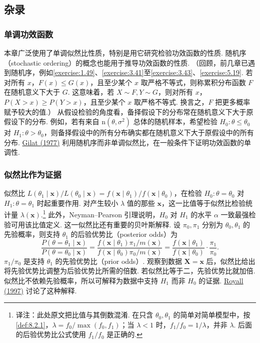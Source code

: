 \subsection{杂录}\label{sec:8.5}
\subsubsection{单调功效函数}\label{sec:8.5.1}
本章广泛使用了单调似然比性质，特别是用它研究检验功效函数的性质. 随机序（stochastic ordering）的概念也能用于推导功效函数的性质. （回顾，前几章已遇到随机序，例如\autoref{exercise:1.49}、\autoref{exercise:3.41}至\autoref{exercise:3.43}、\autoref{exercise:5.19}. 若对所有 $x$，$F(x)\le G(x)$，且至少某个 $x$ 取严格不等式，则称累积分布函数 $F$ 在随机意义下大于 $G$. 这意味着，若 $X\sim F,Y\sim G$，则对所有 $x$，$P(X>x)\ge P(Y>x)$，且至少某个 $x$ 取严格不等式. 换言之，$F$ 把更多概率赋予较大的值.）
从假设检验的角度看，备择假设下的分布常在随机意义下大于原假设下的分布. 例如，若有来自 $\mathrm n(\theta,\sigma^2)$ 总体的随机样本，希望检验 $H_0:\theta\le\theta_0$ 对 $H_1:\theta>\theta_0$，则备择假设中的所有分布确实都在随机意义下大于原假设中的所有分布. \hyperref[bib:source142]{Gilat (1977)} 利用随机序而非单调似然比，在一般条件下证明功效函数的单调性.

\subsubsection{似然比作为证据}\label{sec:8.5.2}
似然比 $L(\theta_1\mid\boldsymbol x)/L(\theta_0\mid\boldsymbol x)=f(\boldsymbol x\mid\theta_1)/f(\boldsymbol x\mid\theta_0)$，在检验 $H_0:\theta=\theta_0$ 对 $H_1:\theta=\theta_1$ 时起重要作用. 对产生较小 $\lambda$ 值的那些 $\boldsymbol x$，这一比值等于似然比检验统计量 $\lambda(\boldsymbol x)$.\footnote{译注：此处原文把比值与其倒数混淆. 在只含 $\theta_0,\theta_1$ 的简单对简单模型中，按\autoref{def:8.2.1}，$\lambda=f_0/\max(f_0,f_1)$；当 $\lambda<1$ 时，$f_1/f_0=1/\lambda$，并非 $\lambda$. 后面的后验优势比公式使用 $f_1/f_0$ 是正确的.} 此外，Neyman–Pearson 引理说明，$H_0$ 对 $H_1$ 的水平 $\alpha$ 一致最强检验可用该比值定义. 这一似然比还有重要的贝叶斯解释. 设 $\pi_0,\pi_1$ 分别为 $\theta_0,\theta_1$ 的先验概率，则支持 $\theta_1$ 的后验优势比（posterior odds）为
$$\frac{P(\theta=\theta_1\mid\boldsymbol x)}{P(\theta=\theta_0\mid\boldsymbol x)}
=\frac{f(\boldsymbol x\mid\theta_1)\pi_1/m(\boldsymbol x)}{f(\boldsymbol x\mid\theta_0)\pi_0/m(\boldsymbol x)}
=\frac{f(\boldsymbol x\mid\theta_1)}{f(\boldsymbol x\mid\theta_0)}\cdot\frac{\pi_1}{\pi_0}.$$
$\pi_1/\pi_0$ 是支持 $\theta_1$ 的先验优势比（prior odds\mbox{）.} 观察到数据 $\boldsymbol X=\boldsymbol x$ 后，似然比给出将先验优势比调整为后验优势比所需的倍数. 若似然比等于二，先验优势比就加倍. 似然比不依赖先验概率，所以可解释为数据中支持 $H_1$ 而非 $H_0$ 的证据. \hyperref[bib:source265]{Royall (1997)} 讨论了这种解释.

